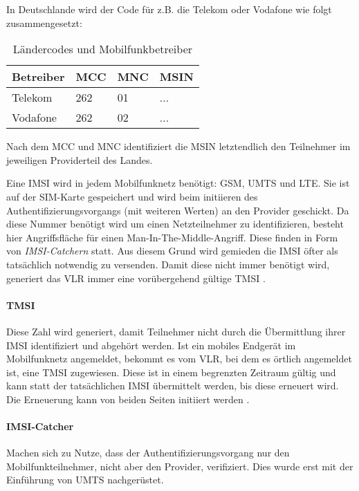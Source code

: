 In Deutschlande wird der Code für z.B. die Telekom oder Vodafone wie folgt zusammengesetzt:

  \begin{table}[h]
    \begin{tabularx}{\textwidth}{|l||l|l|X|}
    \hline
      \textbf{Betreiber} & \textbf{MCC} & \textbf{MNC} & \textbf{MSIN} \\
    \hline
    \hline
      Telekom & 262 & 01 & ... \\
    \hline
    \hline
      Vodafone & 262 & 02 & ...\\
    \hline
    \end{tabularx}
    \caption{Ländercodes und Mobilfunkbetreiber}
  \end{table}

Nach dem \ac{MCC} und \ac{MNC} identifiziert die \ac{MSIN} letztendlich
den Teilnehmer im jeweiligen Providerteil des Landes.

Eine \ac{IMSI} wird in jedem Mobilfunknetz benötigt: \ac{GSM}, \ac{UMTS}
und \ac{LTE}. Sie ist auf der SIM-Karte gespeichert und wird beim
initiieren des Authentifizierungsvorgangs (mit weiteren Werten) an
den Provider geschickt. Da diese Nummer benötigt wird um einen Netzteilnehmer
zu identifizieren, besteht hier Angriffsfläche für einen Man-In-The-Middle-Angriff. Diese finden in Form von \textit{IMSI-Catchern} statt.
Aus diesem Grund wird gemieden die IMSI öfter als tatsächlich notwendig
zu versenden. Damit diese nicht immer benötigt wird, generiert das
\ac{VLR} immer eine vorübergehend gültige \ac{TMSI} \cite{3gpp.33.003}.

\paragraph{TMSI} Diese Zahl wird generiert, damit Teilnehmer nicht
durch die Übermittlung ihrer \ac{IMSI} identifiziert und abgehört werden.
Ist ein mobiles Endgerät im Mobilfunknetz angemeldet, bekommt es vom
\ac{VLR}, bei dem es örtlich angemeldet ist, eine \ac{TMSI} zugewiesen.
Diese ist in einem begrenzten Zeitraum gültig und kann statt der
tatsächlichen \ac{IMSI} übermittelt werden, bis diese erneuert wird.
Die Erneuerung kann von beiden Seiten initiiert werden \cite{3gpp.33.003}.

\label{par:imsicatcher}
\paragraph{IMSI-Catcher} Machen sich zu Nutze, dass der
Authentifizierungsvorgang nur den Mobilfunkteilnehmer, nicht aber den 
Provider, verifiziert. Dies wurde erst mit der Einführung von \ac{UMTS}
nachgerüstet.

